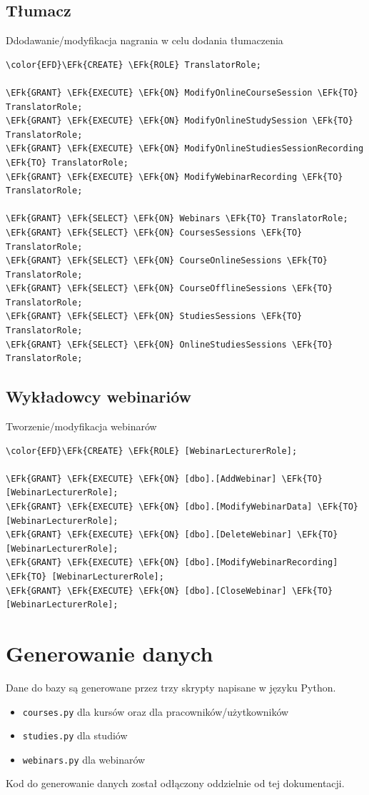 \documentclass[11pt]{article}
\newcommand{\EFk}[1]{\textcolor{EFk}{\textbf{#1}}} %
\begin{document}
\subsection{Tłumacz}
\label{sec:org1fffd29}
Ddodawanie/modyfikacja nagrania w celu dodania tłumaczenia
\begin{Code}
\begin{Verbatim}
\color{EFD}\EFk{CREATE} \EFk{ROLE} TranslatorRole;

\EFk{GRANT} \EFk{EXECUTE} \EFk{ON} ModifyOnlineCourseSession \EFk{TO} TranslatorRole;
\EFk{GRANT} \EFk{EXECUTE} \EFk{ON} ModifyOnlineStudySession \EFk{TO} TranslatorRole;
\EFk{GRANT} \EFk{EXECUTE} \EFk{ON} ModifyOnlineStudiesSessionRecording \EFk{TO} TranslatorRole;
\EFk{GRANT} \EFk{EXECUTE} \EFk{ON} ModifyWebinarRecording \EFk{TO} TranslatorRole;

\EFk{GRANT} \EFk{SELECT} \EFk{ON} Webinars \EFk{TO} TranslatorRole;
\EFk{GRANT} \EFk{SELECT} \EFk{ON} CoursesSessions \EFk{TO} TranslatorRole;
\EFk{GRANT} \EFk{SELECT} \EFk{ON} CourseOnlineSessions \EFk{TO} TranslatorRole;
\EFk{GRANT} \EFk{SELECT} \EFk{ON} CourseOfflineSessions \EFk{TO} TranslatorRole;
\EFk{GRANT} \EFk{SELECT} \EFk{ON} StudiesSessions \EFk{TO} TranslatorRole;
\EFk{GRANT} \EFk{SELECT} \EFk{ON} OnlineStudiesSessions \EFk{TO} TranslatorRole;
\end{Verbatim}
\end{Code}
\subsection{Wykładowcy webinariów}
\label{sec:org0cfdfc0}
Tworzenie/modyfikacja webinarów
\begin{Code}
\begin{Verbatim}
\color{EFD}\EFk{CREATE} \EFk{ROLE} [WebinarLecturerRole];

\EFk{GRANT} \EFk{EXECUTE} \EFk{ON} [dbo].[AddWebinar] \EFk{TO} [WebinarLecturerRole];
\EFk{GRANT} \EFk{EXECUTE} \EFk{ON} [dbo].[ModifyWebinarData] \EFk{TO} [WebinarLecturerRole];
\EFk{GRANT} \EFk{EXECUTE} \EFk{ON} [dbo].[DeleteWebinar] \EFk{TO} [WebinarLecturerRole];
\EFk{GRANT} \EFk{EXECUTE} \EFk{ON} [dbo].[ModifyWebinarRecording] \EFk{TO} [WebinarLecturerRole];
\EFk{GRANT} \EFk{EXECUTE} \EFk{ON} [dbo].[CloseWebinar] \EFk{TO} [WebinarLecturerRole];
\end{Verbatim}
\end{Code}
\section{Generowanie danych}
\label{sec:org627bec2}
Dane do bazy są generowane przez trzy skrypty napisane w języku Python. 
\begin{itemize}
\item \texttt{courses.py} dla kursów oraz dla pracowników/użytkowników
\item \texttt{studies.py} dla studiów
\item \texttt{webinars.py} dla webinarów
\end{itemize}
Kod do generowanie danych został odłączony oddzielnie od tej dokumentacji.
\end{document}
